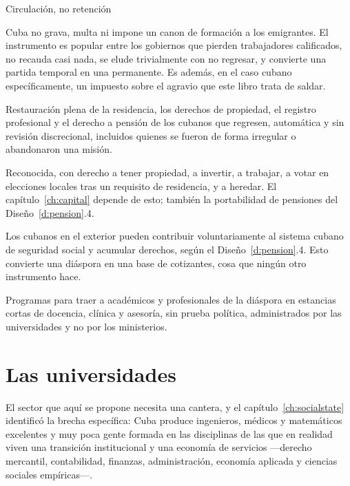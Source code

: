 \begin{design}{Circulación, no retención}
\label{d:diaspora}
\begin{rules}
 Cuba no grava, multa ni impone un canon de formación a los
emigrantes. El instrumento es popular entre los gobiernos que pierden trabajadores
calificados, no recauda casi nada, se elude trivialmente con no regresar, y convierte una
partida temporal en una permanente. Es además, en el caso cubano específicamente, un impuesto
sobre el agravio que este libro trata de saldar.

 Restauración plena de la residencia, los derechos de
propiedad, el registro profesional y el derecho a pensión de los cubanos que regresen,
automática y sin revisión discrecional, incluidos quienes se fueron de forma irregular o
abandonaron una misión.

 Reconocida, con derecho a tener propiedad, a invertir, a trabajar,
a votar en elecciones locales tras un requisito de residencia, y a heredar. El
capítulo~\ref{ch:capital} depende de esto; también la portabilidad de pensiones del
Diseño~\ref{d:pension}.4.

 Los cubanos en el exterior pueden contribuir voluntariamente
al sistema cubano de seguridad social y acumular derechos, según el
Diseño~\ref{d:pension}.4. Esto convierte una diáspora en una base de cotizantes, cosa que
ningún otro instrumento hace.

 Programas para traer a académicos y profesionales de la
diáspora en estancias cortas de docencia, clínica y asesoría, sin prueba política,
administrados por las universidades y no por los ministerios.
\end{rules}
\end{design}

\section{Las universidades}

El sector que aquí se propone necesita una cantera, y el capítulo~\ref{ch:socialstate}
identificó la brecha específica: Cuba produce ingenieros, médicos y matemáticos excelentes y
muy poca gente formada en las disciplinas de las que en realidad viven una transición
institucional y una economía de servicios ---derecho mercantil, contabilidad, finanzas,
administración, economía aplicada y ciencias sociales empíricas---.

